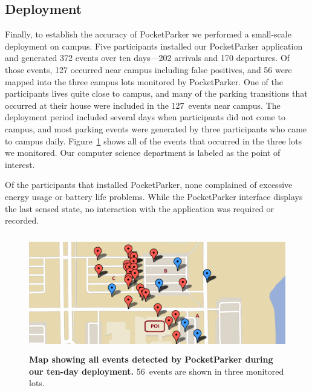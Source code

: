 \subsection{Deployment}

Finally, to establish the accuracy of PocketParker we performed a small-scale
deployment on campus. Five participants installed our PocketParker
application and generated 372 events over ten days---202 arrivals and 170
departures. Of those events, 127 occurred near campus including false
positives, and 56 were mapped into the three campus lots monitored by
PocketParker. One of the participants lives quite close to campus, and many
of the parking transitions that occurred at their house were included in the
127~events near campus. The deployment period included several days when
participants did not come to campus, and most parking events were generated
by three participants who came to campus daily. Figure~\ref{fig-events} shows
all of the events that occurred in the three lots we monitored. Our computer
science department is labeled as the point of interest.

Of the participants that installed PocketParker, none complained of excessive
energy usage or battery life problems. While the PocketParker interface
displays the last sensed state, no interaction with the application was
required or recorded.

\begin{figure}
\centering
\includegraphics[width=\textwidth,height=2in]{./figures/detectedEventsOnMap.pdf}

\caption{\textbf{Map showing all events detected by PocketParker during our
ten-day deployment.} 56~events are shown in three monitored lots.}

\label{fig-events}
\end{figure}

